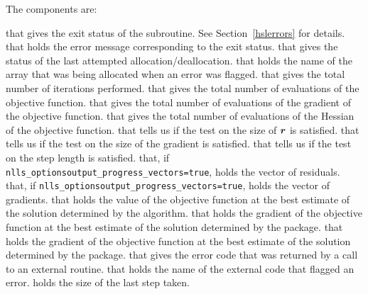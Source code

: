 
The components are:
\begin{description}
that gives the exit status of the subroutine.  See Section~\ref{hslerrors} for details.
 that holds the error message corresponding to the exit status.
 that gives the status of the last attempted allocation/deallocation.
 that holds the name of the array that was being allocated when an error was flagged.
 that gives the total number of iterations performed.
 that gives the total number of evaluations of the objective function.
 that gives the total number of evaluations of the gradient of the objective function.
 that gives the total number of evaluations of the Hessian of the objective function.
 that tells us if the test on the size of \({\bm r}\) is satisfied.
 that tells us if the test on the size of the gradient is satisfied.
 that tells us if the test on the step length is satisfied.
 that, if {\tt nlls\_options\ct output\_progress\_vectors=true}, holds the vector of residuals.
 that, if {\tt nlls\_options\ct output\_progress\_vectors=true}, holds the vector of gradients.
 that holds the value of the objective function at the best estimate of the solution determined by the algorithm.
 that holds the gradient of the objective function at the best estimate of the solution determined by the package.
 that holds the gradient of the objective function at the best estimate of the solution determined by the package.
 that gives the error code that was returned by a call to an external routine.
 that holds the name of the external code that flagged an error.
 holds the size of the last step taken.
\end{description}


